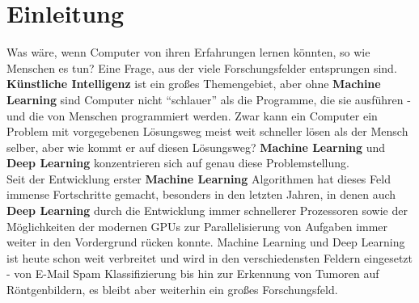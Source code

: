 \chapter{Einleitung}
Was w\"are, wenn Computer von ihren Erfahrungen lernen k\"onnten, so wie Menschen es tun? Eine Frage, aus der viele Forschungsfelder entsprungen sind. \textbf{K\"unstliche Intelligenz} ist ein gro{\ss}es Themengebiet, aber ohne \textbf{Machine Learning} sind Computer nicht "`schlauer"' als die Programme, die sie ausf\"uhren - und die von Menschen programmiert werden. Zwar kann ein Computer ein Problem mit vorgegebenen L\"osungsweg meist weit schneller l\"osen als der Mensch selber, aber wie kommt er auf diesen L\"osungsweg? \textbf{Machine Learning} und\textbf{ Deep Learning} konzentrieren sich auf genau diese Problemstellung.\\
Seit der Entwicklung erster \textbf{ Machine Learning} Algorithmen hat dieses Feld immense Fortschritte gemacht, besonders in den letzten Jahren, in denen auch\textbf{ Deep Learning} durch die Entwicklung immer schnellerer Prozessoren sowie der M\"oglichkeiten der modernen GPUs zur Parallelisierung von Aufgaben immer weiter in den Vordergrund r\"ucken konnte.
Machine Learning und Deep Learning ist heute schon weit verbreitet und wird in den verschiedensten Feldern eingesetzt - von  E-Mail Spam Klassifizierung bis hin zur Erkennung von Tumoren auf R\"ontgenbildern, es bleibt aber weiterhin ein gro{\ss}es Forschungsfeld.


